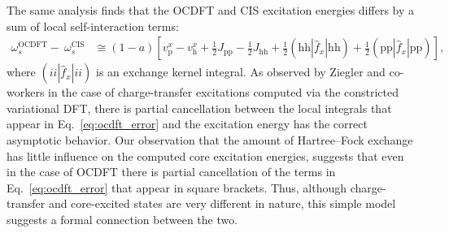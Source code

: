 \documentclass[12pt]{article}
\begin{document}
The same analysis finds that the OCDFT and CIS excitation energies differs by a sum of  local self-interaction terms:
\begin{align}
\label{eq:ocdft_error}
\omega^{\text{OCDFT}}_s - \ \omega^{\text{CIS}}_s  &\cong (1 - a) [v_{\text{p}}^x - v_{\text{h}}^x + \frac{1}{2} J_{\text{pp}} - \frac{1}{2} J_{\text{hh}}+ \frac{1}{2} (\text{hh}|\hat{f}_x|\text{hh}) +\frac{1}{2} (\text{pp}|\hat{f}_x|\text{pp})] ,
\end{align}
where $(ii|\hat{f}_x|ii)$
is an exchange kernel integral.
As observed by Ziegler and co-workers in the case of charge-transfer excitations computed via the constricted variational DFT,\cite{ziegler_implementation_2012} there is partial cancellation between the local integrals that appear in Eq.~\eqref{eq:ocdft_error} and the  excitation energy has the correct asymptotic behavior.
Our observation that the amount of Hartree--Fock exchange has little influence on the computed core excitation energies, suggests that even in the case of OCDFT there is partial cancellation of the terms in Eq.~\eqref{eq:ocdft_error} that appear in square brackets.
Thus, although charge-transfer and core-excited states are very different in nature, this simple model suggests a formal connection between the two.
\end{document}
